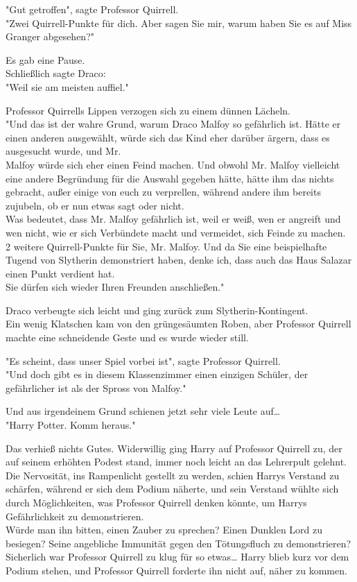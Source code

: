 {"Gut getroffen", sagte Professor Quirrell.\\ "Zwei Quirrell-Punkte für dich. Aber sagen Sie mir, warum haben Sie es auf Miss Granger abgesehen?"

Es gab eine Pause.\\ Schließlich sagte Draco:\\ "Weil sie am meisten auffiel."

Professor Quirrells Lippen verzogen sich zu einem dünnen Lächeln.\\ "Und das ist der wahre Grund, warum Draco Malfoy so gefährlich ist. Hätte er einen anderen ausgewählt, würde sich das Kind eher darüber ärgern, dass es ausgesucht wurde, und Mr.\\ Malfoy würde sich eher einen Feind machen. Und obwohl Mr. Malfoy vielleicht eine andere Begründung für die Auswahl gegeben hätte, hätte ihm das nichts gebracht, außer einige von euch zu verprellen, während andere ihm bereits zujubeln, ob er nun etwas sagt oder nicht.\\ Was bedeutet, dass Mr. Malfoy gefährlich ist, weil er weiß, wen er angreift und wen nicht, wie er sich Verbündete macht und vermeidet, sich Feinde zu machen.\\ 2 weitere Quirrell-Punkte für Sie, Mr. Malfoy. Und da Sie eine beispielhafte Tugend von Slytherin demonstriert haben, denke ich, dass auch das Haus Salazar einen Punkt verdient hat.\\ Sie dürfen sich wieder Ihren Freunden anschließen."

Draco verbeugte sich leicht und ging zurück zum Slytherin-Kontingent.\\ Ein wenig Klatschen kam von den grüngesäumten Roben, aber Professor Quirrell machte eine schneidende Geste und es wurde wieder still.

"Es scheint, dass unser Spiel vorbei ist", sagte Professor Quirrell.\\ "Und doch gibt es in diesem Klassenzimmer einen einzigen Schüler, der gefährlicher ist als der Spross von Malfoy."

Und aus irgendeinem Grund schienen jetzt sehr viele Leute auf…\\ "Harry Potter. Komm heraus."

Das verhieß nichts Gutes. Widerwillig ging Harry auf Professor Quirrell zu, der auf seinem erhöhten Podest stand, immer noch leicht an das Lehrerpult gelehnt.\\ Die Nervosität, ins Rampenlicht gestellt zu werden, schien Harrys Verstand zu schärfen, während er sich dem Podium näherte, und sein Verstand wühlte sich durch Möglichkeiten, was Professor Quirrell denken könnte, um Harrys Gefährlichkeit zu demonstrieren.\\ Würde man ihn bitten, einen Zauber zu sprechen? Einen Dunklen Lord zu besiegen? Seine angebliche Immunität gegen den Tötungsfluch zu demonstrieren? Sicherlich war Professor Quirrell zu klug für so etwas… Harry blieb kurz vor dem Podium stehen, und Professor Quirrell forderte ihn nicht auf, näher zu kommen.

}
